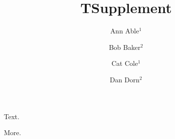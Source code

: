 \documentclass{llncs}
\begin{document}
\title{T}
\author{Ann Able$^{1}$ \and Bob Baker$^{2}$}
\maketitle
Text.
\title{Supplement}
\author{Cat Cole$^{1}$ \and Dan Dorn$^{2}$}
\maketitle
More.
\end{document}
